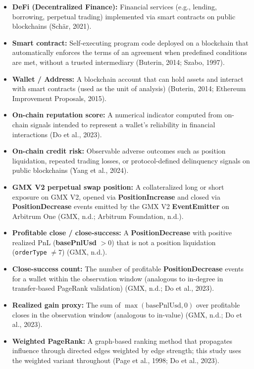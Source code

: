 \begin{itemize}
\item[\textbullet] \textbf{DeFi (Decentralized Finance): }Financial services (e.g., lending, borrowing, perpetual trading) implemented via smart contracts on public blockchains (Sch\"{a}r, 2021).
\item[\textbullet] \textbf{Smart contract: }Self-executing program code deployed on a blockchain that automatically enforces the terms of an agreement when predefined conditions are met, without a trusted intermediary (Buterin, 2014; Szabo, 1997).
\item[\textbullet] \textbf{Wallet / Address: }A blockchain account that can hold assets and interact with smart contracts (used as the unit of analysis) (Buterin, 2014; Ethereum Improvement Proposals, 2015).
\item[\textbullet] \textbf{On-chain reputation score: }A numerical indicator computed from on-chain signals intended to represent a wallet's reliability in financial interactions (Do et al., 2023).
\item[\textbullet] \textbf{On-chain credit risk: }Observable adverse outcomes such as position liquidation, repeated trading losses, or protocol-defined delinquency signals on public blockchains (Yang et al., 2024).
\item[\textbullet] \textbf{GMX V2 perpetual swap position: }A collateralized long or short exposure on GMX V2, opened via \textbf{PositionIncrease} and closed via \textbf{PositionDecrease} events emitted by the GMX V2 \textbf{EventEmitter} on Arbitrum One (GMX, n.d.; Arbitrum Foundation, n.d.).
\item[\textbullet] \textbf{Profitable close / close-success: }A \textbf{PositionDecrease} with positive realized PnL (\textbf{basePnlUsd} $> 0$) that is not a position liquidation (\texttt{orderType} $\neq 7$) (GMX, n.d.).
\item[\textbullet] \textbf{Close-success count: }The number of profitable \textbf{PositionDecrease} events for a wallet within the observation window (analogous to in-degree in transfer-based PageRank validation) (GMX, n.d.; Do et al., 2023).
\item[\textbullet] \textbf{Realized gain proxy: }The sum of $\max(\text{basePnlUsd}, 0)$ over profitable closes in the observation window (analogous to in-value) (GMX, n.d.; Do et al., 2023).
\item[\textbullet] \textbf{Weighted PageRank: }A graph-based ranking method that propagates influence through directed edges weighted by edge strength; this study uses the weighted variant throughout (Page et al., 1998; Do et al., 2023).

\end{itemize}
